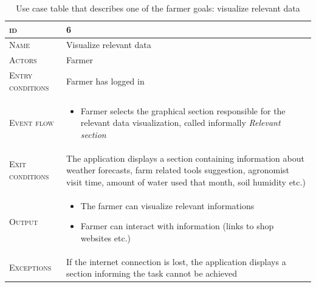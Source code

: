 \begin{table}[H]
    \centering
    \begin{tabular}{|l|p{}|}
        \hline %
    	\textsc{id}                 &   6\\
    	\hline %
    	\textsc{Name}               &   Visualize relevant data\\
    	\hline %
    	\textsc{Actors}             &   Farmer\\
    	\hline %
    	\textsc{Entry conditions}   &   Farmer has logged in\\
    	\hline %
    	\textsc{Event flow}         &   %
            	                        \begin{itemize}
                                    	    \item Farmer selects the graphical section responsible for the relevant data visualization, called informally \textit{Relevant section}
                                        \end{itemize}\\
        \hline %
        \textsc{Exit conditions}    &  The application displays a section containing information about weather forecasts, farm related tools suggestion, agronomist visit time, amount of water used that month, soil humidity etc.)\\
    	\hline %
    	\textsc{Output}             &  \begin{itemize}
    	    \item The farmer can visualize relevant informations
    	    \item Farmer can interact with information (links to shop websites etc.)
    	\end{itemize}\\
    	\hline %
    	\textsc{Exceptions}         &   If the internet connection is lost, the application displays a section informing the task cannot be achieved\\
    	\hline %
        
    \end{tabular}

\caption{\label{tab:visualize_relevant_data}Use case table that describes one of the farmer goals: visualize relevant data}
\end{table}
